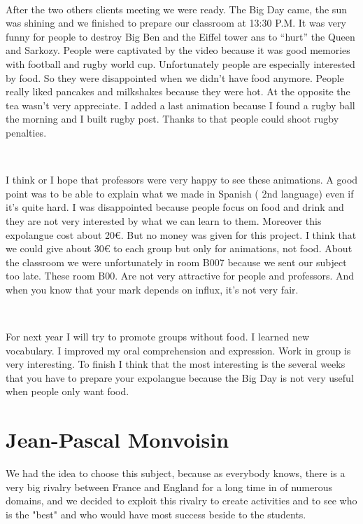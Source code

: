 \documentclass[11pt;a4paper]{report}
\begin{document}
~

    After the two others clients meeting we were ready.  The Big Day came, the sun was shining and we finished to prepare our classroom at 13:30 P.M. It was very funny for people to destroy Big Ben and the Eiffel tower ans to “hurt”  the Queen and Sarkozy.  People were captivated by the video because it was good memories with football and rugby world cup.  Unfortunately people are especially interested by food. So they were disappointed when we didn't have food anymore. People really liked pancakes and milkshakes because they were hot. At the opposite the tea wasn't very appreciate. I added a last animation because I found a rugby ball the morning and I built rugby post. Thanks to that people could shoot rugby penalties. 

~

    I think or I hope that professors were very happy to see these animations. A good point was to be able to explain what we made in Spanish ( 2nd language) even if it's quite hard. I was disappointed because people focus on food and drink and they are not very interested by what we can learn to them. Moreover this expolangue cost about 20\euro{}. But no money was given for this project. I think that we could give about 30\euro{} to each group but only for animations, not food. About the classroom we were unfortunately in room B007 because we sent our subject too late. These room B00. Are not very attractive for people and professors. And when you know that your mark depends on influx, it's not very fair.

~

    For next year I will try to promote groups without food. I learned new vocabulary. I improved my oral comprehension and expression. Work in group is very interesting. To finish I think that the most interesting is the several weeks that you have to prepare your expolangue because the Big Day is not very useful when people only want food. 

\newpage
  \section{Jean-Pascal Monvoisin}

We had the idea to choose this subject, because as everybody knows, there is a very big rivalry between France and England for a long time in of numerous domains, and we decided to exploit this rivalry to create activities and to see who is the "best" and who would have most success beside to the students.
\end{document}
